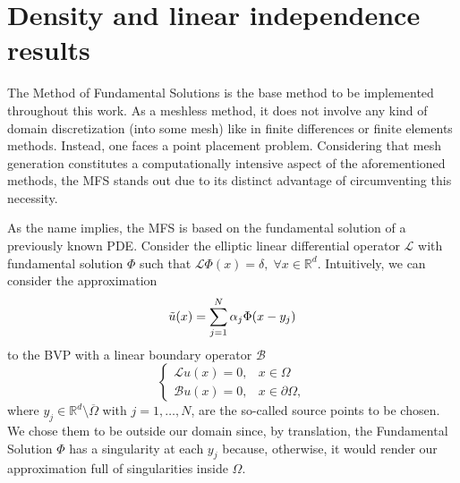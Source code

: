 \label{chap:numerical}

\section{Density and linear independence results}\label{density_proofs_section}

The Method of Fundamental Solutions is the base method to be implemented throughout this work. As a meshless method, it does not involve any kind of domain discretization (into some mesh) like in finite differences or finite elements methods. Instead, one faces a point placement problem. Considering that mesh generation constitutes a computationally intensive aspect of the aforementioned methods, the \ac{MFS} stands out due to its distinct advantage of circumventing this necessity. 

As the name implies, the \ac{MFS} is based on the fundamental solution of a previously known \ac{PDE}. Consider the elliptic linear differential operator \(\mathcal{L}\) with fundamental solution \(\Phi\) such that \(\mathcal{L}\Phi(x) = \delta, \; \forall x \in \mathbb{R}^d\). Intuitively, we can consider the approximation
\[
\Tilde{u}(x) = \sum_{j=1}^{N}\alpha_j \Phi(x-y_j)
\]
to the \ac{BVP} with a linear boundary operator \(\mathcal{B}\)
\[
\begin{cases}
    \mathcal{L}u(x) = 0,  & x \in \Omega\\
    \mathcal{B}u(x) = 0,  & x \in \partial\Omega,
\end{cases}
\]
where \(y_j \in \mathbb{R}^d\setminus \overline{\Omega}\) with \(j=1,\dots,N\), are the so-called source points to be chosen. We chose them to be outside our domain since, by translation, the Fundamental Solution \(\Phi\) has a singularity at each \(y_j\) because, otherwise, it would render our approximation full of singularities inside \(\Omega\). 

